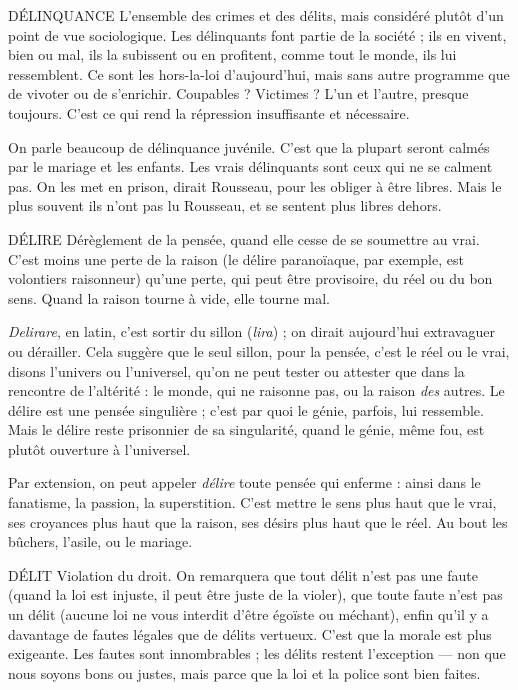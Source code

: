 DÉLINQUANCE L'ensemble des crimes et des délits, mais considéré plutôt
d’un point de vue sociologique. Les délinquants font
partie de la société ; ils en vivent, bien ou mal, ils la subissent ou en profitent,
comme tout le monde, ils lui ressemblent. Ce sont les hors-la-loi d’aujourd’hui,
mais sans autre programme que de vivoter ou de s'enrichir. Coupables ?
Victimes ? L’un et l’autre, presque toujours. C’est ce qui rend la répression
insuffisante et nécessaire.

On parle beaucoup de délinquance juvénile. C’est que la plupart seront
calmés par le mariage et les enfants. Les vrais délinquants sont ceux qui ne se
calment pas. On les met en prison, dirait Rousseau, pour les obliger à être
libres. Mais le plus souvent ils n’ont pas lu Rousseau, et se sentent plus libres
dehors.

DÉLIRE Dérèglement de la pensée, quand elle cesse de se soumettre au vrai.
C’est moins une perte de la raison (le délire paranoïaque, par
exemple, est volontiers raisonneur) qu’une perte, qui peut être provisoire, du
réel ou du bon sens. Quand la raison tourne à vide, elle tourne mal.

{\it Delirare}, en latin, c’est sortir du sillon ({\it lira}) ; on dirait aujourd’hui extravaguer
ou dérailler. Cela suggère que le seul sillon, pour la pensée, c’est le réel ou
le vrai, disons l’univers ou l’universel, qu’on ne peut tester ou attester que dans
la rencontre de l’altérité : le monde, qui ne raisonne pas, ou la raison {\it des} autres.
Le délire est une pensée singulière ; c’est par quoi le génie, parfois, lui ressemble.
Mais le délire reste prisonnier de sa singularité, quand le génie, même
fou, est plutôt ouverture à l’universel.

Par extension, on peut appeler {\it délire} toute pensée qui enferme : ainsi dans
le fanatisme, la passion, la superstition. C’est mettre le sens plus haut que le
vrai, ses croyances plus haut que la raison, ses désirs plus haut que le réel. Au
bout les bûchers, l'asile, ou le mariage.

DÉLIT Violation du droit. On remarquera que tout délit n’est pas une faute
(quand la loi est injuste, il peut être juste de la violer), que toute
faute n’est pas un délit (aucune loi ne vous interdit d’être égoïste ou méchant),
enfin qu’il y a davantage de fautes légales que de délits vertueux. C’est que la
morale est plus exigeante. Les fautes sont innombrables ; les délits restent
l'exception — non que nous soyons bons ou justes, mais parce que la loi et la
police sont bien faites.

